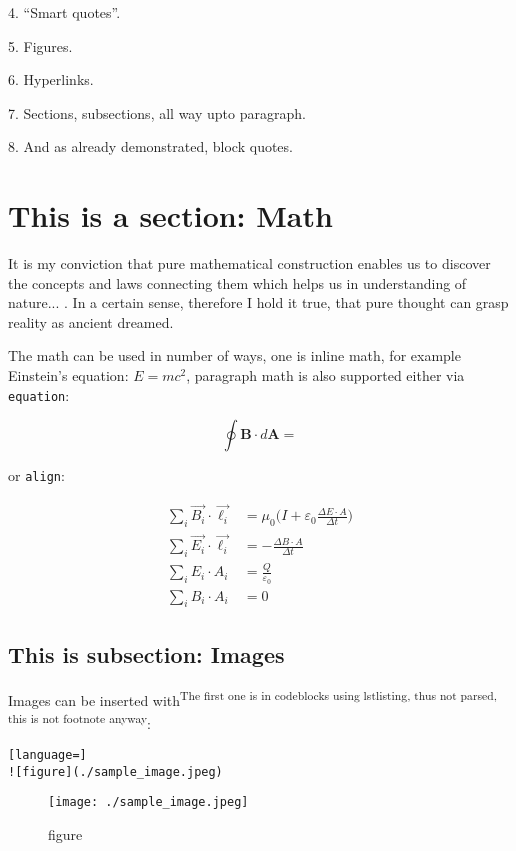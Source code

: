 \documentclass[12pt, UTF8]{article}
\begin{document}
	4. ``Smart quotes''.
	
	5. Figures.
	
	6. Hyperlinks.
	
	7. Sections, subsections, all way upto paragraph.
	
	8. And as already demonstrated, block quotes.
	
	\newpage
	
	\section{This is a section: Math}
	
	\begin{displayquote}
		It is my conviction that pure mathematical construction enables us to discover
		the concepts and laws connecting them which helps us in understanding of nature... .
		In a certain sense, therefore I hold it true, that pure thought
		can grasp reality as ancient dreamed.
	\end{displayquote}
	
	The math can be used in number of ways, one is inline math, for example Einstein's equation: $E = mc^2$, paragraph math is also supported either via \texttt{equation}:
	
	\begin{equation}
		\oint \boldsymbol{B} \cdot d \boldsymbol{A} = 
	\end{equation}
	
	or \texttt{align}:
	
	\begin{align}
		\sum_{i} \vec{B_{i}} \cdot \vec{\ell_{i}} &= \mu_{0} \bigg(I + \varepsilon_{0} \frac{\Delta E \cdot A}{\Delta t} \bigg)\\
		\sum_{i} \vec{E_{i}} \cdot \vec{\ell_{i}} &= - \frac{\Delta B \cdot A}{\Delta t}\\
		\sum_{i} E_{i} \cdot A_{i} &= \frac{Q}{\varepsilon_{0}}\\
		\sum_{i} B_{i} \cdot A_{i} &= 0
	\end{align}
	
	\subsection{This is subsection: Images}
	
	Images can be inserted with\textsuperscript{The first one is in codeblocks using lstlisting, thus not parsed, this is not footnote anyway}:
	
\begin{lstlisting}[language=]
![figure](./sample_image.jpeg)
\end{lstlisting}
	\begin{figure}[h]
		\texttt{[image: ./sample\_image.jpeg]}
		\caption{figure}
	\end{figure}
	
\end{document}
